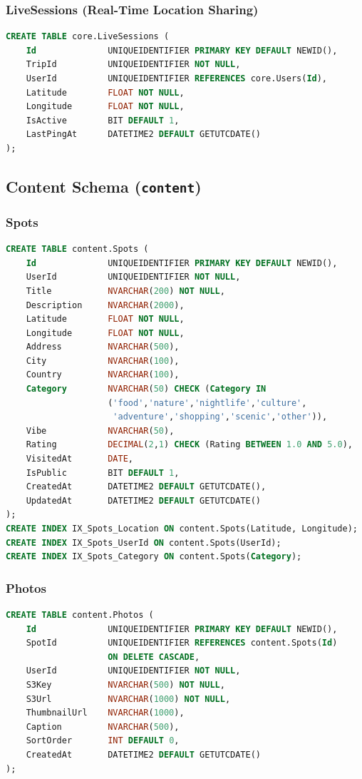 \documentclass[12pt,letterpaper]{article}
\begin{document}
\subsubsection{LiveSessions (Real-Time Location Sharing)}
\begin{lstlisting}[style=code,language=SQL]
CREATE TABLE core.LiveSessions (
    Id              UNIQUEIDENTIFIER PRIMARY KEY DEFAULT NEWID(),
    TripId          UNIQUEIDENTIFIER NOT NULL,
    UserId          UNIQUEIDENTIFIER REFERENCES core.Users(Id),
    Latitude        FLOAT NOT NULL,
    Longitude       FLOAT NOT NULL,
    IsActive        BIT DEFAULT 1,
    LastPingAt      DATETIME2 DEFAULT GETUTCDATE()
);
\end{lstlisting}

\subsection{Content Schema (\texttt{content})}

\subsubsection{Spots}
\begin{lstlisting}[style=code,language=SQL]
CREATE TABLE content.Spots (
    Id              UNIQUEIDENTIFIER PRIMARY KEY DEFAULT NEWID(),
    UserId          UNIQUEIDENTIFIER NOT NULL,
    Title           NVARCHAR(200) NOT NULL,
    Description     NVARCHAR(2000),
    Latitude        FLOAT NOT NULL,
    Longitude       FLOAT NOT NULL,
    Address         NVARCHAR(500),
    City            NVARCHAR(100),
    Country         NVARCHAR(100),
    Category        NVARCHAR(50) CHECK (Category IN
                    ('food','nature','nightlife','culture',
                     'adventure','shopping','scenic','other')),
    Vibe            NVARCHAR(50),
    Rating          DECIMAL(2,1) CHECK (Rating BETWEEN 1.0 AND 5.0),
    VisitedAt       DATE,
    IsPublic        BIT DEFAULT 1,
    CreatedAt       DATETIME2 DEFAULT GETUTCDATE(),
    UpdatedAt       DATETIME2 DEFAULT GETUTCDATE()
);
CREATE INDEX IX_Spots_Location ON content.Spots(Latitude, Longitude);
CREATE INDEX IX_Spots_UserId ON content.Spots(UserId);
CREATE INDEX IX_Spots_Category ON content.Spots(Category);
\end{lstlisting}

\subsubsection{Photos}
\begin{lstlisting}[style=code,language=SQL]
CREATE TABLE content.Photos (
    Id              UNIQUEIDENTIFIER PRIMARY KEY DEFAULT NEWID(),
    SpotId          UNIQUEIDENTIFIER REFERENCES content.Spots(Id)
                    ON DELETE CASCADE,
    UserId          UNIQUEIDENTIFIER NOT NULL,
    S3Key           NVARCHAR(500) NOT NULL,
    S3Url           NVARCHAR(1000) NOT NULL,
    ThumbnailUrl    NVARCHAR(1000),
    Caption         NVARCHAR(500),
    SortOrder       INT DEFAULT 0,
    CreatedAt       DATETIME2 DEFAULT GETUTCDATE()
);
\end{lstlisting}
\end{document}
